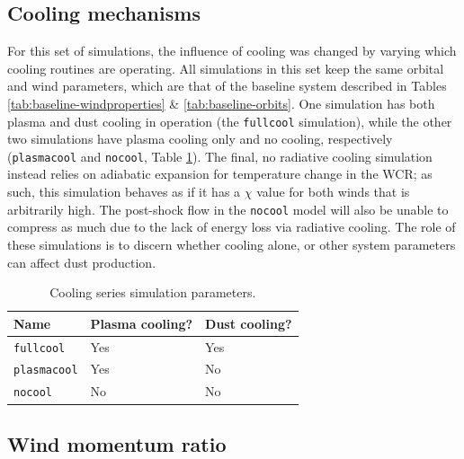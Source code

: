 \documentclass[fleqn,usenatbib]{mnras}
\begin{document}
\subsection{Cooling mechanisms}

For this set of simulations, the influence of cooling was changed by varying which cooling routines are operating.
All simulations in this set keep the same orbital and wind parameters, which are that of the baseline system described in Tables \ref{tab:baseline-windproperties} \& \ref{tab:baseline-orbits}.
One simulation has both plasma and dust cooling in operation (the \texttt{fullcool} simulation), while the other two simulations have plasma cooling only and no cooling, respectively (\texttt{plasmacool} and \texttt{nocool}, Table \ref{tab:cooling-param}).
The final, no radiative cooling simulation instead relies on adiabatic expansion for temperature change in the WCR; as such, this simulation behaves as if it has a $\chi$ value for both winds that is arbitrarily high.
The post-shock flow in the \texttt{nocool} model will also be unable to compress as much due to the lack of energy loss via radiative cooling.
The role of these simulations is to discern whether cooling alone, or other system parameters can affect dust production.


\begin{table}
  \centering
  \begin{tabular}{lll}
    \hline
    Name & Plasma cooling? & Dust cooling? \\
    \hline
    \texttt{fullcool} & Yes & Yes \\ 
    \texttt{plasmacool} & Yes & No \\
    \texttt{nocool} & No & No \\
    \hline
  \end{tabular}
  \caption{Cooling series simulation parameters.}
  \label{tab:cooling-param}
\end{table}

\subsection{Wind momentum ratio}
\end{document}
